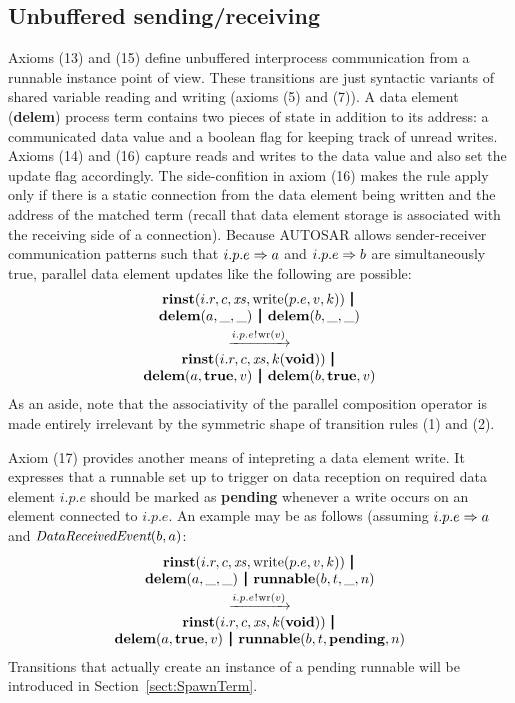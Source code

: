 \documentclass[twocolumn]{article}
\begin{document}
\subsection{Unbuffered sending/receiving}

Axioms (13) and (15) define unbuffered interprocess communication from a runnable instance point of view. These transitions are just syntactic variants of shared variable reading and writing (axioms (5) and (7)). A data element ({\bf delem}) process term contains two pieces of state in addition to its address: a communicated data value and a boolean flag for keeping track of unread writes. Axioms (14) and (16) capture reads and writes to the data value and also set the update flag accordingly. The side-confition in axiom (16) makes the rule apply only if there is a static connection from the data element being written and the address of the matched term (recall that data element storage is associated with the receiving side of a connection). Because AUTOSAR allows sender-receiver communication patterns such that $i.p.e \Rightarrow a$ and $i.p.e \Rightarrow b$ are simultaneously true, parallel data element updates like the following are possible:
$$
\begin{array}{c}
	\Trinst {i.r} c \Xs {\TrteWrite {p.e} v k} \,\Opar  \\
	{\Tdelem a \_ \_} \Opar {\Tdelem b \_ \_} \vspace{0.6ex} \\
	\red{\say{i.p.e}{\Twr v}} \\
	\Trinst {i.r} c \Xs {\Tap k \Tvoid} \,\Opar \\
	{\Tdelem a \Ttrue v} \Opar {\Tdelem b \Ttrue v}
\end{array}
$$
As an aside, note that the associativity of the parallel composition operator is made entirely irrelevant by the symmetric shape of transition rules (1) and (2).

Axiom (17) provides another means of intepreting a data element write. It expresses that a runnable set up to trigger on data reception on required data element $i.p.e$ should be marked as {\bf pending} whenever a write occurs on an element connected to $i.p.e$. An example may be as follows (assuming $i.p.e \Rightarrow a$ and $\emph{DataReceivedEvent}(b,a)$:
$$
\begin{array}{c}
	\Trinst {i.r} c \Xs {\TrteWrite {p.e} v k} \,\Opar  \\
	{\Tdelem a \_ \_} \Opar {\Trunnable b t \_ n} \vspace{0.6ex} \\
	\red{\say{i.p.e}{\Twr v}} \\
	\Trinst {i.r} c \Xs {\Tap k \Tvoid} \,\Opar \\
	{\Tdelem a \Ttrue v} \Opar {\Trunnable b t \Tpending n}
\end{array}
$$
Transitions that actually create an instance of a pending runnable will be introduced in Section~\ref{sect:SpawnTerm}.
\end{document}
